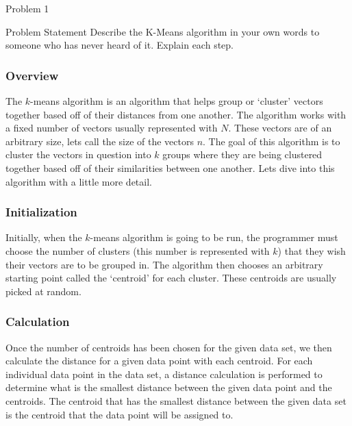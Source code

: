 \begin{problem}{Problem 1}
    \begin{statement}{Problem Statement}
        Describe the K-Means algorithm in your own words to someone who has never heard of it. Explain each step.
    \end{statement}

    \begin{Highlight}[Solution]
        \subsubsection*{Overview}

        The $k$-means algorithm is an algorithm that helps group or `cluster' vectors together based off of their distances from one another. The algorithm works with a fixed number of vectors usually 
        represented with $N$. These vectors are of an arbitrary size, lets call the size of the vectors $n$. The goal of this algorithm is to cluster the vectors in question into $k$ groups where they
        are being clustered together based off of their similarities between one another. Lets dive into this algorithm with a little more detail. \vspace*{1em}

        \subsubsection*{Initialization}

        Initially, when the $k$-means algorithm is going to be run, the programmer must choose the number of clusters (this number is represented with $k$) that they wish their vectors are to be grouped
        in. The algorithm then chooses an arbitrary starting point called the `centroid' for each cluster. These centroids are usually picked at random. \vspace*{1em}

        \subsubsection*{Calculation}

        Once the number of centroids has been chosen for the given data set, we then calculate the distance for a given data point with each centroid. For each individual data point in the data set, a distance
        calculation is performed to determine what is the smallest distance between the given data point and the centroids. The centroid that has the smallest distance between the given data set is the centroid
        that the data point will be assigned to. \vspace*{1em}


\end{Highlight}
\end{problem}
